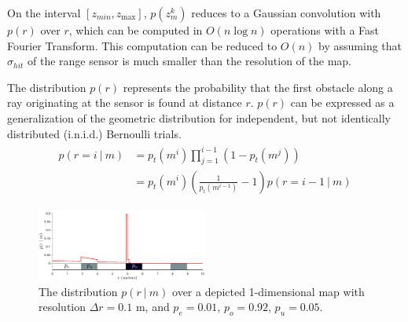 \documentclass[conference]{IEEEtran}
\begin{document}
On the interval $\left[z_{min}, z_{\max}\right]$, $p(z_{m}^{k})$ reduces to a Gaussian convolution with $p(r)$ over $r$, which can be computed in $O(n \log n)$ operations with a Fast Fourier Transform. This computation can be reduced to $O(n)$ by assuming that $\sigma_{hit}$ of the range sensor is much smaller than the resolution of the map.

The distribution $p(r)$ represents the probability that the first obstacle along a ray originating at the sensor is found at distance $r$. $p(r)$ can be expressed as a generalization of the geometric distribution for independent, but not identically distributed (i.n.i.d.) Bernoulli trials.
%
\begin{align}
  \begin{split}
    p(r = i
    \ \vert \
    m)
    &=
    p_{t}(m^i)
    \prod_{j=1}^{i-1}
    \left(
      1 - p_{t}(m^{j})
    \right)
    \\
    &=
    p_{t}(m^i)
    \left(
      \frac{1}{p_{t}(m^{i-1})} - 1
    \right)
    p(r = i - 1
    \ \vert \
    m)
  \end{split}
\end{align}


\begin{figure}
  \centering
  \includegraphics[width=0.5\textwidth]{meas_model.pdf}
  \caption{The distribution $p(r \ \vert \ m)$ over a depicted 1-dimensional map with resolution $\Delta r = 0.1$ m, and $p_{e} = 0.01$, $p_{o} = 0.92$, $p_{u} = 0.05$. \label{fig:measurement_model}}
\end{figure}
\end{document}
